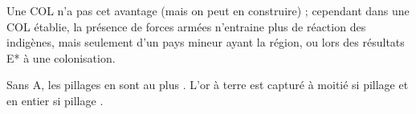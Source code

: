 \aparag Une COL n'a pas cet avantage (mais on peut en construire) ;
cependant dans une COL établie, la présence de forces armées
n'entraine plus de réaction des indigènes, mais
seulement d'un pays mineur ayant la région, ou lors des
résultats E* à une colonisation.

\aparag[Pillages]
\bparag Sans A, les pillages en \ROTW sont au plus \Facemoins.
\bparag L'or à terre est capturé à moitié si pillage \Facemoins et en
entier si pillage \Faceplus.





